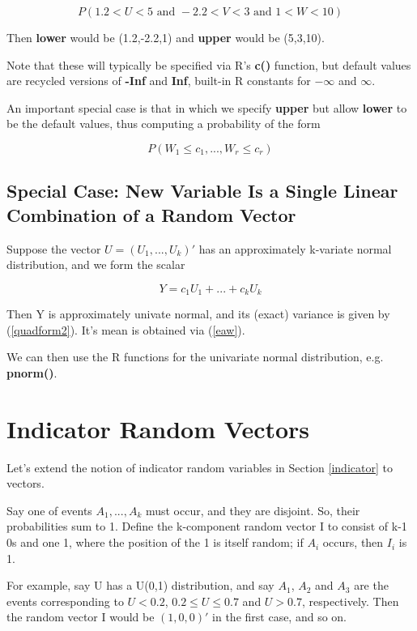 \begin{equation}
P( 1.2 < U < 5 \textrm{ and } -2.2 < V < 3 \textrm{ and } 1 < W < 10)
\end{equation}

Then {\bf lower} would be (1.2,-2.2,1) and {\bf upper} would be
(5,3,10).

Note that these will typically be specified via R's {\bf c()} function,
but default values are recycled versions of {\bf -Inf} and {\bf Inf},
built-in R constants for $-\infty$ and $\infty$.

An important special case is that in which we specify {\bf upper}
but allow {\bf lower} to be the default values, thus computing a
probability of the form

\begin{equation}
P(W_1 \leq c_1,...,W_r \leq c_r)
\end{equation}

\subsection{Special Case: New Variable Is a Single Linear Combination of
a Random Vector} 
\label{singlelincomb}

Suppose the vector $U = (U_1,...,U_k)'$ has an approximately k-variate
normal distribution, and we form the scalar

\begin{equation}
Y = c_1 U_1 + ...+ c_k U_k
\end{equation}

Then Y is approximately univate normal, and its (exact) variance is
given by (\ref{quadform2}).  It's mean is obtained via (\ref{eaw}).

We can then use the R functions for the univariate normal distribution,
e.g. {\bf pnorm()}.

\section{Indicator Random Vectors}
\label{indicvecs}

Let's extend the notion of indicator random variables in Section
\ref{indicator} to vectors.

Say one of events $A_1,...,A_k$ must occur, and they are disjoint.  So,
their probabilities sum to 1.  Define the k-component random vector I to
consist of k-1 0s and one 1, where the position of the 1 is itself
random; if $A_i$ occurs, then $I_i$ is 1.

For example, say U has a U(0,1) distribution, and say $A_1$, $A_2$ and
$A_3$ are the events corresponding to $U < 0.2$, $0.2 \leq U \leq 0.7$
and $U > 0.7$, respectively.  Then the random vector I would be
$(1,0,0)'$ in the first case, and so on.  

